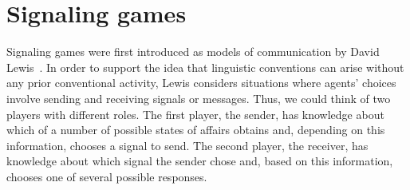 \documentclass[a4paper]{article}
\begin{document}
\section{Signaling games}
\label{sec:signaling-games}

Signaling games were first introduced as models of communication by David Lewis~\parencite*{lewis_convention_1969}.
In order to support the idea that linguistic conventions can arise without any prior conventional activity, Lewis considers situations where agents' choices involve sending and receiving signals or messages.
Thus, we could think of two players with different roles.
The first player, the sender, has knowledge about which of a number of possible states of affairs obtains and, depending on this information, chooses a signal to send.
The second player, the receiver, has knowledge about which signal the sender chose and, based on this information, chooses one of several possible responses.
\end{document}
